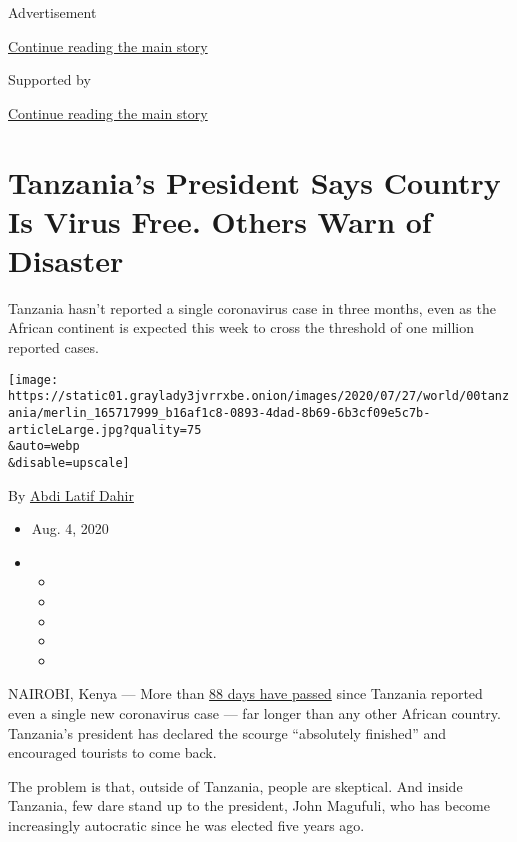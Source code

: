 Advertisement

\protect\hyperlink{after-top}{Continue reading the main story}

Supported by

\protect\hyperlink{after-sponsor}{Continue reading the main story}

\hypertarget{tanzanias-president-says-country-is-virus-free-others-warn-of-disaster}{%
\section{Tanzania's President Says Country Is Virus Free. Others Warn of
Disaster}\label{tanzanias-president-says-country-is-virus-free-others-warn-of-disaster}}

Tanzania hasn't reported a single coronavirus case in three months, even
as the African continent is expected this week to cross the threshold of
one million reported cases.

\texttt{[image: https://static01.graylady3jvrrxbe.onion/images/2020/07/27/world/00tanzania/merlin\_165717999\_b16af1c8-0893-4dad-8b69-6b3cf09e5c7b-articleLarge.jpg?quality=75\\\&auto=webp\\\&disable=upscale]}

By \href{https://www.nytimes3xbfgragh.onion/by/abdi-latif-dahir}{Abdi
Latif Dahir}

\begin{itemize}
\item
  Aug. 4, 2020
\item
  \begin{itemize}
  \item
  \item
  \item
  \item
  \item
  \end{itemize}
\end{itemize}

NAIROBI, Kenya --- More than
\href{https://www.who.int/docs/default-source/coronaviruse/situation-reports/20200804-covid-19-sitrep-197.pdf?sfvrsn=94f7a01d_2}{88
days have passed} since Tanzania reported even a single new coronavirus
case --- far longer than any other African country. Tanzania's president
has declared the scourge ``absolutely finished'' and encouraged tourists
to come back.

The problem is that, outside of Tanzania, people are skeptical. And
inside Tanzania, few dare stand up to the president, John Magufuli, who
has become increasingly autocratic since he was elected five years ago.

